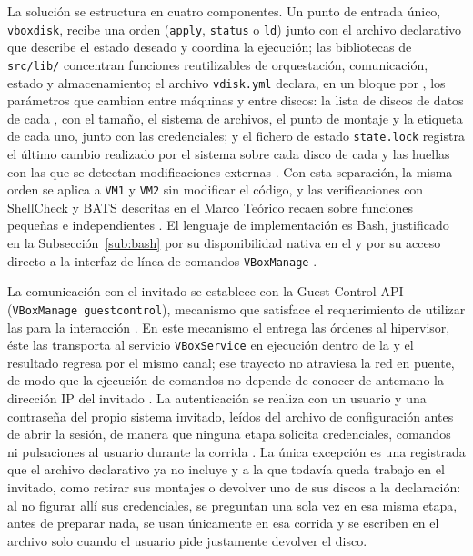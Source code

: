 La solución se estructura en cuatro componentes. Un punto de entrada único, \texttt{vboxdisk}, recibe una orden (\texttt{apply}, \texttt{status} o \texttt{ld}) junto con el archivo declarativo que describe el estado deseado y coordina la ejecución; las bibliotecas de \texttt{src/lib/} concentran funciones reutilizables de orquestación, comunicación, estado y almacenamiento; el archivo \texttt{vdisk.yml} declara, en un bloque por \vm{}, los parámetros que cambian entre máquinas y entre discos: la lista de discos de datos de cada \vm{}, con el tamaño, el sistema de archivos, el punto de montaje y la etiqueta de cada uno, junto con las credenciales; y el fichero de estado \texttt{state.lock} registra el último cambio realizado por el sistema sobre cada disco de cada \vm{} y las huellas con las que se detectan modificaciones externas \parencite{bash_best_practices}. Con esta separación, la misma orden se aplica a \texttt{VM1} y \texttt{VM2} sin modificar el código, y las verificaciones con ShellCheck y BATS descritas en el Marco Teórico recaen sobre funciones pequeñas e independientes \parencite{shellcheck, bats_testing}. El lenguaje de implementación es Bash, justificado en la Subsección~\ref{sub:bash} por su disponibilidad nativa en el \host{} y por su acceso directo a la interfaz de línea de comandos \texttt{VBoxManage} \parencite{virtualbox_vboxmanage}.

La comunicación con el invitado se establece con la Guest Control API (\texttt{VBoxManage guestcontrol}), mecanismo que satisface el requerimiento de utilizar las \guestadditions{} para la interacción \parencite{virtualbox_guestcontrol}. En este mecanismo el \host{} entrega las órdenes al hipervisor, éste las transporta al servicio \texttt{VBoxService} en ejecución dentro de la \vm{} y el resultado regresa por el mismo canal; ese trayecto no atraviesa la red en puente, de modo que la ejecución de comandos no depende de conocer de antemano la dirección IP del invitado \parencite{virtualbox_guestadditions, virtualbox_advanced_topics}. La autenticación se realiza con un usuario y una contraseña del propio sistema invitado, leídos del archivo de configuración antes de abrir la sesión, de manera que ninguna etapa solicita credenciales, comandos ni pulsaciones al usuario durante la corrida \parencite{virtualbox_guestcontrol}. La única excepción es una \vm{} registrada que el archivo declarativo ya no incluye y a la que todavía queda trabajo en el invitado, como retirar sus montajes o devolver uno de sus discos a la declaración: al no figurar allí sus credenciales, se preguntan una sola vez en esa misma etapa, antes de preparar nada, se usan únicamente en esa corrida y se escriben en el archivo solo cuando el usuario pide justamente devolver el disco.

